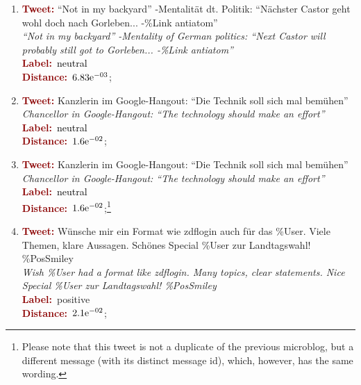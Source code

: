 \begin{enumerate}
\item \textcolor{darkred}{\bfseries Tweet:} ``Not in my backyard'' -Mentalit\"at dt. Politik: ``N\"achster Castor geht wohl doch nach Gorleben... -\%Link antiatom''\\
  \textit{``Not in my backyard'' -Mentality of German politics: ``Next Castor will probably still got to Gorleben... -\%Link antiatom''}\\
  \textcolor{darkred}{\bfseries Label:}~\textcolor{black}{neutral}\\
  \textcolor{darkred}{\bfseries Distance:}~${6.83}\mathrm{e}^{-03}$;

\item \textcolor{darkred}{\bfseries Tweet:} Kanzlerin im Google-Hangout: ``Die Technik soll sich mal bem\"uhen''\\
  \textit{Chancellor in Google-Hangout: ``The technology should make an effort''}\\
  \textcolor{darkred}{\bfseries Label:}~\textcolor{black}{neutral}\\
  \textcolor{darkred}{\bfseries Distance:}~${1.6}\mathrm{e}^{-02}$;\label{snt:cgsa:exmp:kolchyna-error-0.1}

\item \textcolor{darkred}{\bfseries Tweet:} Kanzlerin im
  Google-Hangout: ``Die Technik soll sich mal
  bem\"uhen''\\ \textit{Chancellor in Google-Hangout: ``The technology
    should make an effort''}\\ \textcolor{darkred}{\bfseries
    Label:}~\textcolor{black}{neutral}\\ \textcolor{darkred}{\bfseries
    Distance:}~${1.6}\mathrm{e}^{-02}$;\footnote{Please note that this
    tweet is not a duplicate of the previous microblog, but a
    different message (with its distinct message id), which, however,
    has the same wording.}\label{snt:cgsa:exmp:kolchyna-error-0.2}

\item \textcolor{darkred}{\bfseries Tweet:} W\"unsche mir ein Format wie zdflogin auch f\"ur das \%User. Viele Themen, klare Aussagen. Sch\"ones Special \%User zur Landtagswahl! \%PosSmiley\\
  \textit{Wish \%User had a format like zdflogin. Many topics, clear statements. Nice Special \%User zur Landtagswahl! \%PosSmiley}\\
  \textcolor{darkred}{\bfseries Label:}~\textcolor{green3}{positive}\\
  \textcolor{darkred}{\bfseries Distance:}~${2.1}\mathrm{e}^{-02}$;


\end{enumerate}
